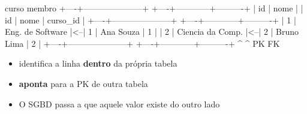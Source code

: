 \begin{frame}[fragile]{}
  \vspace{0.3em}
  \begin{sql}
   curso                          membro
+----+---------------------+   +----+------------+----------+
| id | nome                |   | id | nome       | curso_id |
+----+---------------------+   +----+------------+----------+
|  1 | Eng. de Software    |<--|  1 | Ana Souza  |        1 |
|  2 | Ciencia da Comp.    |<--|  2 | Bruno Lima |        2 |
+----+---------------------+   +----+------------+----------+
       ^                                        ^
       PK                                       FK
  \end{sql}

  \vspace{0.5em}
  \begin{itemize}
    \item {} identifica a linha \textbf{dentro} da própria tabela
    \item {} \textbf{aponta} para a PK de outra tabela
    \item O SGBD passa a  que aquele valor existe do outro lado
  \end{itemize}

\end{frame}

